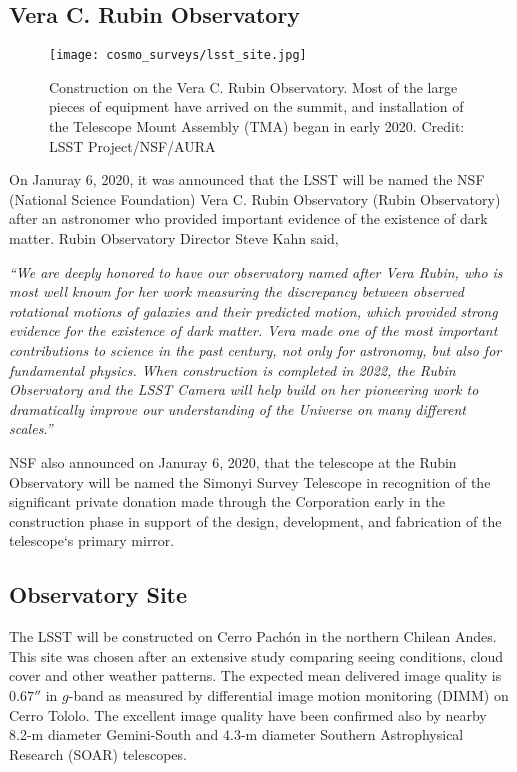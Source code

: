 \subsection{Vera C. Rubin Observatory}
\begin{figure}[ht]
    \centering
    \texttt{[image: cosmo\_surveys/lsst\_site.jpg]}
    \caption{Construction on the Vera C. Rubin Observatory. Most of the large pieces of equipment have arrived on the summit, and installation of the Telescope Mount Assembly (TMA) began in early 2020. Credit: LSST Project/NSF/AURA}
    \label{fig:lsst_site}
\end{figure}
On Januray 6, 2020, it was announced that the LSST will be named the NSF (National Science Foundation) Vera C. Rubin Observatory (Rubin Observatory) after an astronomer who provided important evidence of the existence of dark matter. Rubin Observatory Director Steve Kahn said,

\textit{``We are deeply honored to have our observatory named after Vera Rubin, who is most well known for her work measuring the discrepancy between observed rotational motions of galaxies and their predicted motion, which provided strong evidence for the existence of dark matter. Vera made one of the most important contributions to science in the past century, not only for astronomy, but also for fundamental physics. When construction is completed in 2022, the Rubin Observatory and the LSST Camera will help build on her pioneering work to dramatically improve our understanding of the Universe on many different scales.''}

NSF also announced on Januray 6, 2020, that the telescope at the Rubin Observatory will be named the Simonyi Survey Telescope in recognition of the significant private donation made through the Corporation early in the construction phase in support of the design, development, and fabrication of the telescope`s primary mirror. 

\subsection{Observatory Site}
The LSST will be constructed on Cerro Pach\'{o}n in the northern Chilean Andes. This site was chosen after an extensive study comparing seeing conditions, cloud cover and other weather patterns. The expected mean delivered image quality is $0.67''$ in $g$-band as measured by differential image motion monitoring (DIMM) on Cerro Tololo. The excellent image quality have been confirmed also by nearby 8.2-m diameter Gemini-South and 4.3-m diameter Southern Astrophysical Research (SOAR) telescopes.

